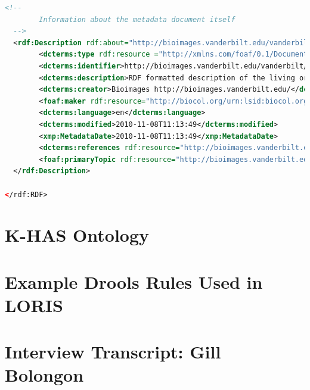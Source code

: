 \begin{appendices}
\begin{lstlisting}[language=XML, caption={Darwin-SW Representation of a Living Specimen}]
  <!--
		Information about the metadata document itself
  -->
  <rdf:Description rdf:about="http://bioimages.vanderbilt.edu/vanderbilt/12-126.rdf">
        <dcterms:type rdf:resource ="http://xmlns.com/foaf/0.1/Document" />
        <dcterms:identifier>http://bioimages.vanderbilt.edu/vanderbilt/12-126.rdf</dcterms:identifier>
        <dcterms:description>RDF formatted description of the living organism http://bioimages.vanderbilt.edu/vanderbilt/12-126</dcterms:description>
        <dcterms:creator>Bioimages http://bioimages.vanderbilt.edu/</dcterms:creator>
        <foaf:maker rdf:resource="http://biocol.org/urn:lsid:biocol.org:col:35115" />
        <dcterms:language>en</dcterms:language>
        <dcterms:modified>2010-11-08T11:13:49</dcterms:modified>
        <xmp:MetadataDate>2010-11-08T11:13:49</xmp:MetadataDate>
        <dcterms:references rdf:resource="http://bioimages.vanderbilt.edu/vanderbilt/12-126"/>
        <foaf:primaryTopic rdf:resource="http://bioimages.vanderbilt.edu/vanderbilt/12-126"/>
  </rdf:Description>

</rdf:RDF>
\end{lstlisting}

\chapter{K-HAS Ontology}\label{appendix:ontology}


\chapter{Example Drools Rules Used in LORIS}\label{appendix:drools}


\chapter{Interview Transcript: Gill Bolongon}\label{appendix:interview}



\end{appendices}
